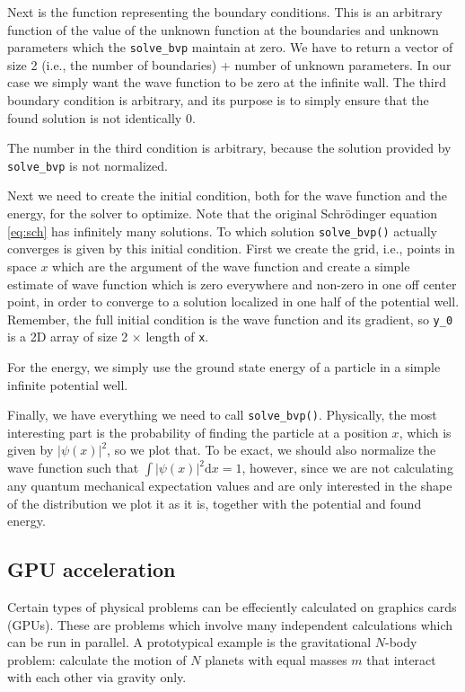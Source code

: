 \documentclass{article}
\newcommand{\dd}{\ensuremath{\mathrm{d}}}
\newcommand{\ls}[1]{\lstinline{#1}}
\begin{document}
Next is the function representing the boundary conditions. This is an arbitrary function of the value of the unknown function at the boundaries and unknown parameters which the \ls{solve_bvp} maintain at zero. We have to return a vector of size 2 (i.e., the number of boundaries) + number of unknown parameters. In our case we simply want the wave function to be zero at the infinite wall. The third boundary condition is arbitrary, and its purpose is to simply ensure that the found solution is not identically 0.

The number in the third condition is arbitrary, because the solution provided by \ls{solve_bvp} is not normalized.

Next we need to create the initial condition, both for the wave function and the energy, for the solver to optimize. Note that the original Schrödinger equation \eqref{eq:sch} has infinitely many solutions. To which solution \ls{solve_bvp()} actually converges is given by this initial condition. First we create the grid, i.e., points in space $x$ which are the argument of the wave function and create a simple estimate of wave function which is zero everywhere and non-zero in one off center point, in order to converge to a solution localized in one half of the potential well. Remember, the full initial condition is the wave function and its gradient, so \ls{y_0} is a 2D array of size 2 $\times$ length of \ls{x}.


For the energy, we simply use the ground state energy of a particle in a simple infinite potential well.


Finally, we have everything we need to call \ls{solve_bvp()}. Physically, the most interesting part is the probability of finding the particle at a position $x$, which is given by $|\psi(x)|^2$, so we plot that. To be exact, we should also normalize the wave function such that $\int |\psi(x)|^2 \dd x = 1$, however, since we are not calculating any quantum mechanical expectation values and are only interested in the shape of the distribution we plot it as it is, together with the potential and found energy.


\subsection{GPU acceleration}
Certain types of physical problems can be effeciently calculated on graphics cards (GPUs). These are problems which involve many independent calculations which can be run in parallel. A prototypical example is the gravitational $N$-body problem: calculate the motion of $N$ planets with equal masses $m$ that interact with each other via gravity only.
\end{document}

